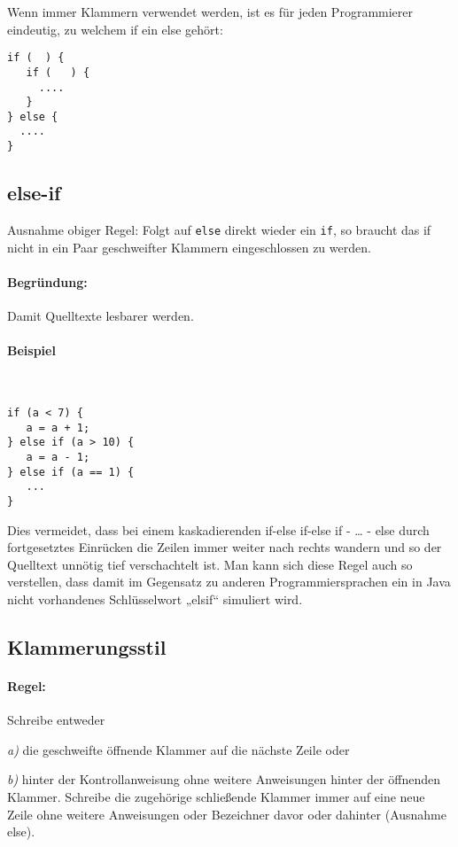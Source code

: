 Wenn immer Klammern verwendet werden, ist es für jeden Programmierer eindeutig, zu welchem if ein else gehört:

\begin{lstlisting}
if (  ) {
   if (   ) {
     ....
   }
} else { 
  ....
}
\end{lstlisting}

\subsection{else-if}

Ausnahme obiger Regel: Folgt auf \texttt{else} direkt wieder ein \texttt{if}, so braucht das if nicht in ein Paar geschweifter Klammern eingeschlossen zu werden.
\paragraph{Begründung:} Damit Quelltexte lesbarer werden.

\paragraph{Beispiel} \hspace{0pt}\\
\begin{lstlisting}
if (a < 7) {
   a = a + 1;
} else if (a > 10) {
   a = a - 1;
} else if (a == 1) {
   ...
}
\end{lstlisting}

Dies vermeidet, dass bei einem kaskadierenden if-else if-else if - … - else durch fortgesetztes Einrücken die Zeilen immer weiter nach rechts wandern und so der Quelltext unnötig tief verschachtelt ist. Man kann sich diese Regel auch so verstellen, dass damit im Gegensatz zu anderen Programmiersprachen ein in Java nicht vorhandenes Schlüsselwort „elsif“ simuliert wird.

\subsection{Klammerungsstil}

\paragraph{Regel:} Schreibe entweder \par\textit{a)} die geschweifte öffnende Klammer auf die nächste Zeile oder \par\textit{b)} hinter der Kontrollanweisung ohne weitere Anweisungen hinter der öffnenden Klammer. Schreibe die zugehörige schließende Klammer immer auf eine neue Zeile ohne weitere Anweisungen oder Bezeichner davor oder dahinter (Ausnahme else).
